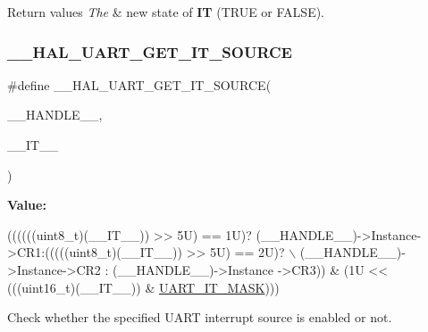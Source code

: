 \begin{DoxyRetVals}{Return values}
{\em The} & new state of {\bfseries IT} (T\+R\+UE or F\+A\+L\+SE). \\
\hline
\end{DoxyRetVals}
\mbox{\label{group___u_a_r_t___exported___macros_gab7ad503802bf56bf397c392fc8e18b77}} 
\subsubsection{\texorpdfstring{\+\_\+\+\_\+\+H\+A\+L\+\_\+\+U\+A\+R\+T\+\_\+\+G\+E\+T\+\_\+\+I\+T\+\_\+\+S\+O\+U\+R\+CE}{\_\_HAL\_UART\_GET\_IT\_SOURCE}}
{\footnotesize\ttfamily \#define \+\_\+\+\_\+\+H\+A\+L\+\_\+\+U\+A\+R\+T\+\_\+\+G\+E\+T\+\_\+\+I\+T\+\_\+\+S\+O\+U\+R\+CE(\begin{DoxyParamCaption}\item[{}]{\+\_\+\+\_\+\+H\+A\+N\+D\+L\+E\+\_\+\+\_\+,  }\item[{}]{\+\_\+\+\_\+\+I\+T\+\_\+\+\_\+ }\end{DoxyParamCaption})}

{\bfseries Value\+:}
\begin{DoxyCode}
((((((uint8\_t)(\_\_IT\_\_)) >> 5U) == 1U)? (\_\_HANDLE\_\_)->Instance->CR1:(((((uint8\_t)(\_\_IT\_\_)) >> 5U) == 2U)? \(\backslash\)
                                                       (\_\_HANDLE\_\_)->Instance->CR2 : (\_\_HANDLE\_\_)->Instance
      ->CR3)) & (1U << (((uint16\_t)(\_\_IT\_\_)) & \hyperlink{group___u_a_r_t___interruption___mask_ga869439269c26e8dee93d49b1c7e67448}{UART\_IT\_MASK})))
\end{DoxyCode}


Check whether the specified U\+A\+RT interrupt source is enabled or not. 


